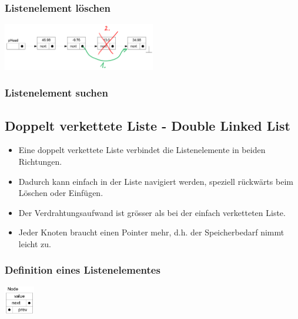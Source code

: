 \subsubsection{Listenelement löschen}
\begin{flushleft}
{\includegraphics[width=0.5\textwidth]{images/Listen/SLL_Delete.png}}
\label{Fig: Element bei SLL l"oschen}
\end{flushleft}


\subsubsection{Listenelement suchen}



\subsection{Doppelt verkettete Liste - Double Linked List}
\begin{itemize}
  \item Eine doppelt verkettete Liste verbindet die Listenelemente in beiden Richtungen.
  \item Dadurch kann einfach in der Liste navigiert werden, speziell rückwärts beim Löschen oder Einfügen.
  \item Der Verdrahtungsaufwand ist grösser als bei der einfach verketteten Liste.
  \item Jeder Knoten braucht einen Pointer mehr, d.h. der Speicherbedarf nimmt leicht zu.
\end{itemize}

\subsubsection{Definition eines Listenelementes}
\begin{flushleft}
  {\includegraphics[width=0.1\textwidth]{images/Listen/DLL.png}}
  \label{Fig: Double Linked List}
\end{flushleft}


